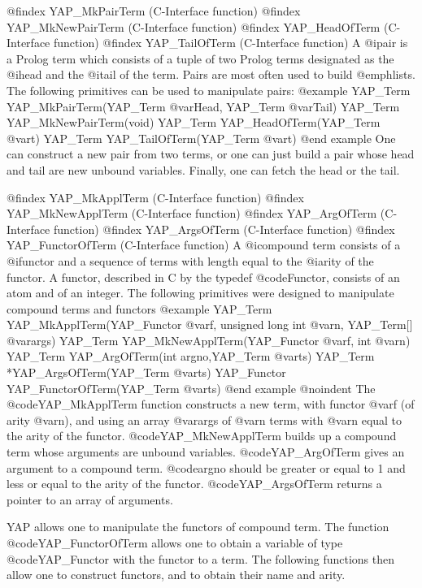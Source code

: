 {{{{{{{{{@findex YAP_MkPairTerm (C-Interface function)
@findex YAP_MkNewPairTerm (C-Interface function)
@findex YAP_HeadOfTerm (C-Interface function)
@findex YAP_TailOfTerm (C-Interface function)
A @i{pair} is a Prolog term which consists of a tuple of two Prolog
terms designated as the @i{head} and the @i{tail} of the term. Pairs are
most often used to build @emph{lists}. The following primitives can be
used to manipulate pairs:
@example
      YAP_Term  YAP_MkPairTerm(YAP_Term @var{Head}, YAP_Term @var{Tail})
      YAP_Term  YAP_MkNewPairTerm(void)
      YAP_Term  YAP_HeadOfTerm(YAP_Term @var{t})
      YAP_Term  YAP_TailOfTerm(YAP_Term @var{t})
@end example
One can construct a new pair from two terms, or one can just build a
pair whose head and tail are new unbound variables. Finally, one can
fetch the head or the tail.

@findex YAP_MkApplTerm (C-Interface function)
@findex YAP_MkNewApplTerm (C-Interface function)
@findex YAP_ArgOfTerm (C-Interface function)
@findex YAP_ArgsOfTerm (C-Interface function)
@findex YAP_FunctorOfTerm (C-Interface function)
A @i{compound} term consists of a @i{functor} and a sequence of terms with
length equal to the @i{arity} of the functor. A functor, described in C by
the typedef @code{Functor}, consists of an atom and of an integer.
The following primitives were designed to manipulate compound terms and 
functors
@example
      YAP_Term     YAP_MkApplTerm(YAP_Functor @var{f}, unsigned long int @var{n}, YAP_Term[] @var{args})
      YAP_Term     YAP_MkNewApplTerm(YAP_Functor @var{f}, int @var{n})
      YAP_Term     YAP_ArgOfTerm(int argno,YAP_Term @var{ts})
      YAP_Term    *YAP_ArgsOfTerm(YAP_Term @var{ts})
      YAP_Functor  YAP_FunctorOfTerm(YAP_Term @var{ts})
@end example
@noindent
The @code{YAP_MkApplTerm} function constructs a new term, with functor
@var{f} (of arity @var{n}), and using an array @var{args} of @var{n}
terms with @var{n} equal to the arity of the
functor. @code{YAP_MkNewApplTerm} builds up a compound term whose
arguments are unbound variables. @code{YAP_ArgOfTerm} gives an argument
to a compound term. @code{argno} should be greater or equal to 1 and
less or equal to the arity of the functor.  @code{YAP_ArgsOfTerm}
returns a pointer to an array of arguments.

YAP allows one to manipulate the functors of compound term. The function
@code{YAP_FunctorOfTerm} allows one to obtain a variable of type
@code{YAP_Functor} with the functor to a term. The following functions
then allow one to construct functors, and to obtain their name and arity. 

}}}}}}}}}
